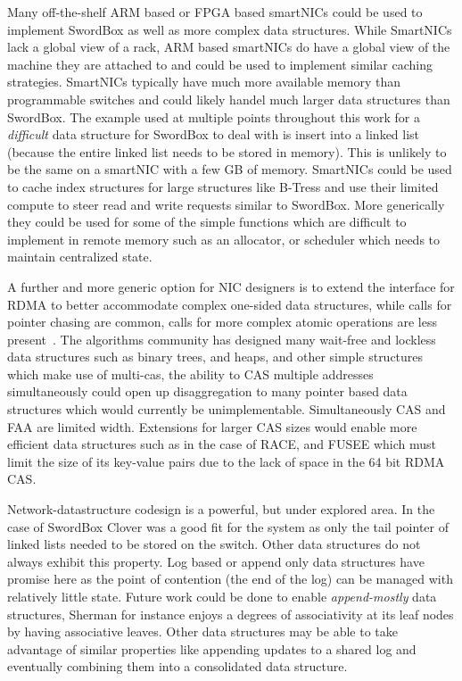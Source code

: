 \documentclass[12pt]{ucsddissertation}
\newcommand{\sword}{SwordBox}
\begin{document}
Many off-the-shelf ARM based or FPGA based smartNICs could be used to implement {\sword} as well as
more complex data structures. While SmartNICs lack a global view of a rack, ARM based smartNICs do
have a global view of the machine they are attached to and could be used to implement similar
caching strategies. SmartNICs typically have much more available memory than programmable switches
and could likely handel much larger data structures than {\sword}. The example used at multiple points
throughout this work for a \textit{difficult} data structure for {\sword} to deal with is insert into
a linked list (because the entire linked list needs to be stored in memory). This is unlikely to be
the same on a smartNIC with a few GB of memory. SmartNICs could be used to cache index structures
for large structures like B-Tress and use their limited compute to steer read and write requests
similar to {\sword}. More generically they could be used for some of the simple functions which are
difficult to implement in remote memory such as an allocator, or scheduler which needs to maintain
centralized state.

A further and more generic option for NIC designers is to extend the interface for RDMA to better
accommodate complex one-sided data structures, while calls for pointer chasing are common, calls for
more complex atomic operations are less present~\cite{prism,clio}. The algorithms community has
designed many wait-free and lockless data structures such as binary trees, and heaps, and other
simple structures which make use of multi-cas, the ability to CAS multiple addresses simultaneously
could open up disaggregation to many pointer based data structures which would currently be
unimplementable. Simultaneously CAS and FAA are limited width.  Extensions for larger CAS sizes
would enable more efficient data structures such as in the case of RACE, and FUSEE which must limit
the size of its key-value pairs due to the lack of space in the 64 bit RDMA CAS.

Network-datastructure codesign is a powerful, but under explored area. In the case of {\sword} Clover
was a good fit for the system as only the tail pointer of linked lists needed to be stored on the
switch. Other data structures do not always exhibit this property. Log based or append only data
structures have promise here as the point of contention (the end of the log) can be managed with
relatively little state. Future work could be done to enable \textit{append-mostly} data structures,
Sherman for instance enjoys a degrees of associativity at its leaf nodes by having associative
leaves. Other data structures may be able to take advantage of similar properties like appending
updates to a shared log and eventually combining them into a consolidated data structure.
\end{document}
